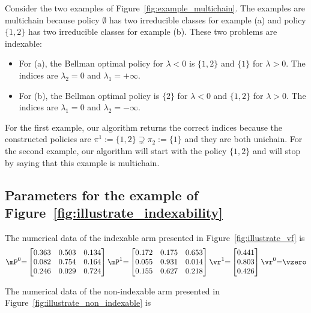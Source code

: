 Consider the two examples of Figure~\ref{fig:example_multichain}. The examples are multichain because policy $\emptyset$ has two irreducible classes for example (a) and policy $\{1,2\}$ has two irreducible classes for example (b). These two problems are indexable:
\begin{itemize}
    \item For (a), the Bellman optimal policy for $\lambda<0$ is $\{1,2\}$ and $\{1\}$ for $\lambda>0$. The indices are $\lambda_2=0$ and $\lambda_1=+\infty$.
    \item For (b), the  Bellman optimal policy is $\{2\}$ for $\lambda<0$  and $\{1,2\}$ for $\lambda>0$. The indices are $\lambda_1=0$ and $\lambda_2=-\infty$.
\end{itemize}
For the first example, our algorithm returns the correct indices because the constructed policies are $\pi^1:=\{1,2\}\supsetneq\pi_2:=\{1\}$ and they are both unichain.  For the second example, our algorithm will start with the policy $\{1,2\}$ and will stop by saying that this example is multichain.

\subsection{Parameters for the example of Figure~\ref{fig:illustrate_indexability}}
\label{apx:non_indexable_example}

The numerical data of the indexable arm presented in Figure~\ref{fig:illustrate_vf} is
\begin{equation*}
    \mP^0{=}\begin{bmatrix}
        0.363 & 0.503 & 0.134 \\
        0.082 & 0.754 & 0.164 \\
        0.246 & 0.029 & 0.724
    \end{bmatrix}
    \mP^1{=}\begin{bmatrix}
        0.172 & 0.175 & 0.653 \\
        0.055 & 0.931 & 0.014 \\
        0.155 & 0.627 & 0.218
    \end{bmatrix}
    \vr^1{=}\begin{bmatrix}
        0.441 \\
        0.803 \\
        0.426
    \end{bmatrix}
    \vr^0{=}\vzero
\end{equation*}

\noindent
The numerical data of the non-indexable arm presented in Figure~\ref{fig:illustrate_non_indexable} is

